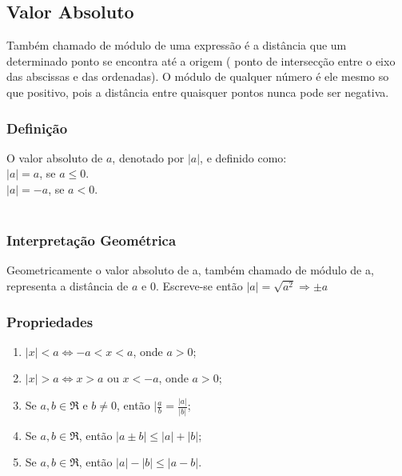 \documentclass[a4paper,12pt,twoside,BCOR=10mm]{scrbook}
\begin{document}
\begin{titlepage}
\subsection{Valor Absoluto}
Também chamado de módulo de uma expressão é a distância que um determinado ponto se encontra até a origem ( ponto de intersecção entre o eixo das abscissas e das ordenadas). O módulo de qualquer número é ele mesmo so que positivo, pois a distância entre quaisquer pontos nunca pode ser negativa.

\subsubsection{Definição}
O valor absoluto de $a$, denotado por $|a|$, e definido como:
\\
$|a| = a$, se $a \leq 0$.\\
$|a| = -a$, se $a < 0$.
\\
\\
\subsubsection{Interpretação Geométrica}
Geometricamente o valor absoluto de a, também chamado de módulo de a, representa a distância de $a$ e 0. Escreve-se então $|a| = \sqrt{a^{2}} \Rightarrow \pm a$
\subsubsection{Propriedades}
\begin{enumerate}
\item $|x| < a \Leftrightarrow -a < x < a$, onde $a > 0$;
\item $|x| > a \Leftrightarrow x > a$ ou $x < -a$, onde $a > 0$;
\item Se $a,b \in \Re$ e $b \neq 0$, então $|\frac{a}{b} = \frac{|a|}{|b|}$;
\item Se $a,b \in \Re$, então $|a \pm b| \leq |a| + |b|$;
\item Se $a,b \in \Re$, então $|a| - |b| \leq |a - b|$.
\end{enumerate}


\end{titlepage}
\end{document}
